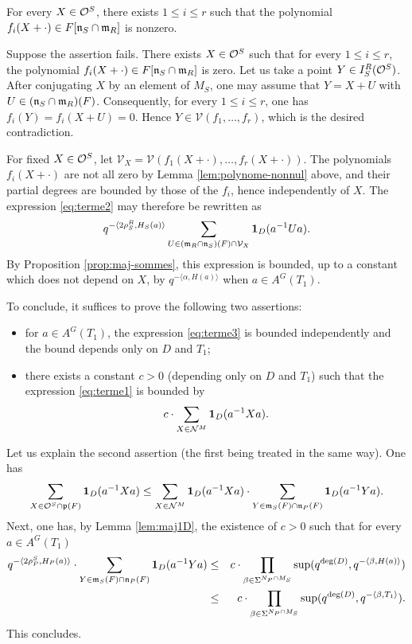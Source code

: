 \begin{paragr}
\begin{preuve}
\begin{lemme}\label{lem:polynome-nonnul}
  For every $X\in \mathcal{O}^S$, there exists $1\leq i\leq r$ such that the polynomial $f_i(X+\cdot)\in F[\mathfrak{n}_S\cap \mathfrak{m}_R]$ is nonzero.
\end{lemme}

\begin{preuve}
  Suppose the assertion fails. There exists $X\in \mathcal{O}^S$ such that for every $1\leq i\leq r$, the polynomial $f_i(X+\cdot)\in F[\mathfrak{n}_S\cap \mathfrak{m}_R]$ is zero. Let us take a point $Y\in I_S^R(\mathcal{O}^S)$. After conjugating $X$ by an element of $M_S$, one may assume that $Y=X+U$ with $U\in (\mathfrak{n}_S\cap \mathfrak{m}_R)(F)$. Consequently, for every $1\leq i\leq r$, one has $f_i(Y)=f_i(X+U)=0$. Hence $Y\in \mathcal{V}(f_1,\ldots,f_r)$, which is the desired contradiction.
\end{preuve}

For fixed $X\in \mathcal{O}^S$, let $\mathcal{V}_X=\mathcal{V}(f_1(X+\cdot),\ldots,f_r(X+\cdot))$. The polynomials $f_i(X+\cdot)$ are not all zero by Lemma \ref{lem:polynome-nonnul} above, and their partial degrees are bounded by those of the $f_i$, hence independently of $X$. The expression \eqref{eq:terme2} may therefore be rewritten as
$$q^{-\langle 2\rho_S^R,H_S(a)\rangle} \sum_{U\in (\mathfrak{m}_R\cap \mathfrak{n}_S)(F)\cap \mathcal{V}_X} \mathbf{1}_D(a^{-1}Ua).$$
By Proposition \ref{prop:maj-sommes}, this expression is bounded, up to a constant which does not depend on $X$, by $q^{-\langle \alpha,H(a)\rangle}$ when $a\in A^G(T_1)$.

To conclude, it suffices to prove the following two assertions:
\begin{itemize}
\item for $a\in A^G(T_1)$, the expression \eqref{eq:terme3} is bounded independently and the bound depends only on $D$ and $T_1$;
\item there exists a constant $c>0$ (depending only on $D$ and $T_1$) such that the expression \eqref{eq:terme1} is bounded by
$$c\cdot \sum_{X\in \mathcal{N}^M} \mathbf{1}_D(a^{-1}Xa).$$
\end{itemize}

Let us explain the second assertion (the first being treated in the same way). One has
$$\sum_{X\in \mathcal{O}^S\cap \mathfrak{p}(F)} \mathbf{1}_D(a^{-1}Xa)\leq \sum_{X\in \mathcal{N}^M} \mathbf{1}_D(a^{-1}Xa)\cdot \sum_{Y\in \mathfrak{m}_S(F)\cap \mathfrak{n}_P(F)} \mathbf{1}_D(a^{-1}Ya).$$
Next, one has, by Lemma \ref{lem:maj1D}, the existence of $c>0$ such that for every $a\in A^G(T_1)$
\begin{eqnarray*}
  q^{-\langle 2\rho_P^S,H_P(a)\rangle}\cdot \sum_{Y\in \mathfrak{m}_S(F)\cap \mathfrak{n}_P(F)} \mathbf{1}_D(a^{-1}Ya)&\leq& c\cdot \prod_{\beta\in \Sigma^{N_P\cap M_S}} \sup(q^{\deg(D)},q^{-\langle \beta,H(a)\rangle})\\
  &\leq& c\cdot \prod_{\beta\in \Sigma^{N_P\cap M_S}} \sup(q^{\deg(D)},q^{-\langle \beta,T_1\rangle}).
\end{eqnarray*}
This concludes.
\end{preuve}
\end{paragr}

